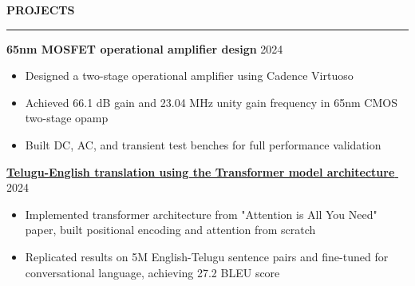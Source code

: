 \documentclass[notitlepage,10pt,a4paper]{article}
\newenvironment{resumesection}[1]{
    \header{#1}
}{}
\newcommand{\header}[1]{
    \vspace{2pt}
    \textcolor{accent1}{\Large \textbf{#1}}
    \vspace{6pt}\hrule\vspace{4pt}
}
\newcommand{\TECH}{
    \textcolor{accent3}{\small\textbf{SKILLS}}\small\,
}
\newcommand{\thingsep}{
    \vspace{4pt}
}
\newcommand{\LINK}[2]{
    \href{#1}{\textbf{#2}\,\,{\small\faExternalLink}}
}
\begin{document}
\begin{resumesection}{PROJECTS}


    \raggedright
    \textcolor{accent2}{\textbf{\large 65nm MOSFET operational amplifier design}} \hfill {2024} \
    {\small\begin{itemize}[noitemsep, font=\small, label={-}, leftmargin=*, topsep=0pt, partopsep=0pt]
        \item Designed a two-stage operational amplifier using Cadence Virtuoso
        \item Achieved 66.1 dB gain and 23.04 MHz unity gain frequency in 65nm CMOS two-stage opamp
        \item Built DC, AC, and transient test benches for full performance validation
    \end{itemize}}
    \thingsep

    \raggedright
    \textcolor{accent2}{\LINK{https://github.com/marisusis/telugu-to-english-with-transformers}{\large Telugu-English translation using the Transformer model architecture}} \hfill {2024} \\
    {\small\begin{itemize}[noitemsep, font=\small, label={-}, leftmargin=*, topsep=0pt, partopsep=0pt]
        \item Implemented transformer architecture from "Attention is All You Need" paper, built positional encoding and attention from scratch
        \item Replicated results on 5M English-Telugu sentence pairs and fine-tuned for conversational language, achieving 27.2 BLEU score
    \end{itemize}}
    \thingsep


\end{resumesection}
\end{document}
